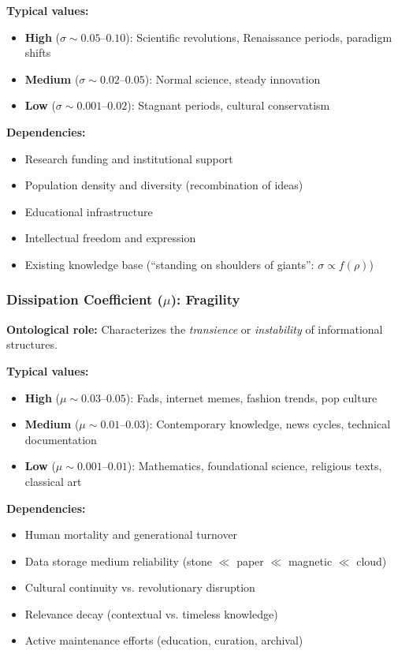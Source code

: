 \documentclass[12pt]{article}
\begin{document}
\textbf{Typical values:}
\begin{itemize}
    \item \textbf{High} ($\sigma \sim 0.05$--$0.10$): Scientific revolutions, Renaissance periods, paradigm shifts
    \item \textbf{Medium} ($\sigma \sim 0.02$--$0.05$): Normal science, steady innovation
    \item \textbf{Low} ($\sigma \sim 0.001$--$0.02$): Stagnant periods, cultural conservatism
\end{itemize}

\textbf{Dependencies:}
\begin{itemize}
    \item Research funding and institutional support
    \item Population density and diversity (recombination of ideas)
    \item Educational infrastructure
    \item Intellectual freedom and expression
    \item Existing knowledge base (``standing on shoulders of giants'': $\sigma \propto f(\rho)$)
\end{itemize}

\subsubsection{Dissipation Coefficient ($\mu$): Fragility}

\textbf{Ontological role:} Characterizes the \emph{transience} or \emph{instability} of informational structures.

\textbf{Typical values:}
\begin{itemize}
    \item \textbf{High} ($\mu \sim 0.03$--$0.05$): Fads, internet memes, fashion trends, pop culture
    \item \textbf{Medium} ($\mu \sim 0.01$--$0.03$): Contemporary knowledge, news cycles, technical documentation
    \item \textbf{Low} ($\mu \sim 0.001$--$0.01$): Mathematics, foundational science, religious texts, classical art
\end{itemize}

\textbf{Dependencies:}
\begin{itemize}
    \item Human mortality and generational turnover
    \item Data storage medium reliability (stone $\ll$ paper $\ll$ magnetic $\ll$ cloud)
    \item Cultural continuity vs. revolutionary disruption
    \item Relevance decay (contextual vs. timeless knowledge)
    \item Active maintenance efforts (education, curation, archival)
\end{itemize}
\end{document}
